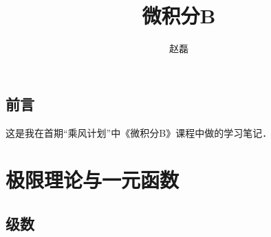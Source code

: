 \documentclass[a4paper,punct=CCT]{ctexbook}
\title{微积分B}
\author{赵磊}
\theoremstyle{definition}
\theoremstyle{remark}
\begin{document}
\frontmatter
{}
\maketitle
\thispagestyle{empty}

\chapter*{前言}

这是我在首期“乘风计划”中《微积分B》课程中做的学习笔记．

\clearpage
\thispagestyle{empty}

\mainmatter

\part{极限理论与一元函数}


\chapter{级数}
\end{document}
